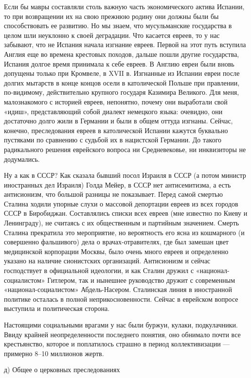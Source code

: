 Если бы мавры составляли столь важную часть экономического актива
Испании, то при возвращении их на свою прежнюю родину они должны
были бы способствовать ее развитию. Но мы знаем, что мусульманские
государства в целом шли неуклонно к своей деградации. Что касается
евреев, то у нас забывают, что не Испания начала изгнание евреев.
Первой на этот путь вступила Англия еще во времена крестовых походов,
дальше пошли другие государства, Испания долгое время принимала к себе
евреев. В Англию евреи были вновь допущены только при Кромвеле, в XVII
в. Изгнанные из Испании евреи после долгих мытарств в конце концов
осели в католической Польше при правлении, по-видимому, действительно
крупного государя Казимира Великого. Для меня, малознакомого с
историей евреев, непонятно, почему они выработали свой «идиш»,
представляющий собой диалект немецкого языка: очевидно, они достаточно
долго жили в Германии и были в общем оттуда изгнаны. Сейчас,
конечно, преследования евреев в католической Испании кажутся буквально
пустяками по сравнению с судьбой их в нацистской Германии. До
такого радикального решения еврейского вопроса ни Средневековье, ни
инквизиторы не додумались.

Ну а как в СССР? Как сказала бывший посол Израиля в СССР (а потом министр
иностранных дел Израиля) Голда Мейер, в СССР нет антисемитизма, а есть
антисионизм, что большой разницы не показывает. Перед самой смертью Сталина
ходили упорные слухи о массовой депортации евреев из всех городов СССР в
Биробиджан. Составлялись списки всех евреев (мне известно по Киеву и
Ленинграду), не считаясь с их общественным и партийным значением. Смерть
Сталина прекратила это мероприятие, но вероятность его ясна из кошмарного (и
совершенно фальшивого) дела о врачах-отравителях, где был замешан цвет
медицинской корпорации Москвы, было очень много евреев и определенно
указано на наличие сионистских организаций. Антисионизм и сейчас
господствует в официальной идеологии, и как Сталин дружил с
«национал-социалистом» Гитлером, так и нынешнее руководство дружит с
современным «национал-социалистом» Абдель-Насером. Сталинская линия в
иностранной политике осталась в полной неприкосновенности. Сейчас в
еврейском вопросе выступила и политическая сторона.

Настоящими социальными врагами у нас были буржуи, кулаки, подкулачники.
Ввиду крайней неопределенности последнего понятия, оно обнимало почти все
крестьянство, которое и поплатилось страшно в период коллективизации ---
примерно 8--10 миллионов жертв.

д) Общее о церковных преследованиях

